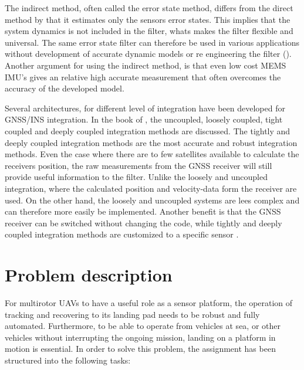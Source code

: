 The indirect method, often called the error state method, differs from the direct method by that it estimates only the sensors error states. This implies that the system dynamics is not included in the filter, whats makes the filter flexible and universal. The same error state filter can therefore be used in various applications without development of accurate dynamic models or re engineering the filter (\cite{roumeliotis1999circumventing}). Another argument for using the indirect method, is that even low cost \gls{MEMS} \gls{IMU}'s gives an relative high accurate measurement that often overcomes the accuracy of the developed model.

Several architectures, for different level of integration have been developed for \gls{GNSS}/INS integration. In the book of \cite{vik2009integrated}, the uncoupled, loosely coupled, tight coupled and deeply coupled integration methods are discussed. The tightly and deeply coupled integration methods are the most accurate and robust integration methods. Even the case where there are to few satellites available to calculate the receivers position, the raw measurements from the \gls{GNSS} receiver will still provide useful information to the filter. Unlike the loosely and uncoupled integration, where the calculated position and velocity-data form the receiver are used. On the other hand, the loosely and uncoupled systems are lees complex and can therefore more easily be implemented. Another benefit is that the \gls{GNSS} receiver can be switched without changing the code, while tightly and deeply coupled integration methods are customized to a specific sensor \cite{vik2009integrated}.

\section{Problem description} %
\label{sec:problem_description}
For multirotor UAVs to have a useful role as a sensor platform, the operation of tracking and recovering to its landing pad needs to be robust and fully automated. Furthermore, to be able to operate from vehicles at sea, or other vehicles without interrupting the ongoing mission, landing on a platform in motion is essential. In order to solve this problem, the assignment has been structured into the following tasks:

